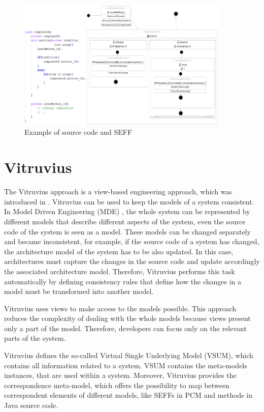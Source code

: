 \begin{figure}[h]
\centering
\includegraphics[width=0.9\textwidth]{figures/code_seff}
\caption{Example of source code and SEFF}
\label{fig:Example of source code and SEFF}
\end{figure}


\section{Vitruvius}
\label{sec:Vitruvius}

The Vitruvius approach is a view-based \cite{goldschmidt2012view} engineering approach, which was introduced in \cite{burger2013flexible, kramer2013view}.  Vitruvius can be used to keep the models of a system consistent. In Model Driven Engineering (MDE) \cite{thomas2005erzeugung}, the whole system can be represented by different models that describe different aspects of the system, even the source code of the system is seen as a model. These models can be changed separately and became inconsistent, for example, if the source code of a system has changed, the architecture model of the system has to be also updated. In this case, architectures must capture the changes in the source code and update accordingly the associated architecture model. Therefore, Vitruvius performs this task automatically by defining consistency rules that define how the changes in a model must be transformed into another model.

Vitruvius uses views to make access to the models possible. This approach reduces the complexity of dealing with the whole models because views present only a part of the model. Therefore, developers can focus only on the relevant parts of the system.

Vitruvius defines the so-called Virtual Single Underlying Model (VSUM), which contains all information related to a system. VSUM contains the meta-models instances, that are used within a system. Moreover, Vitruvius provides the correspondence meta-model, which offers the possibility to map between correspondent elements of different models, like SEFFs in PCM and methods in Java source code.  

